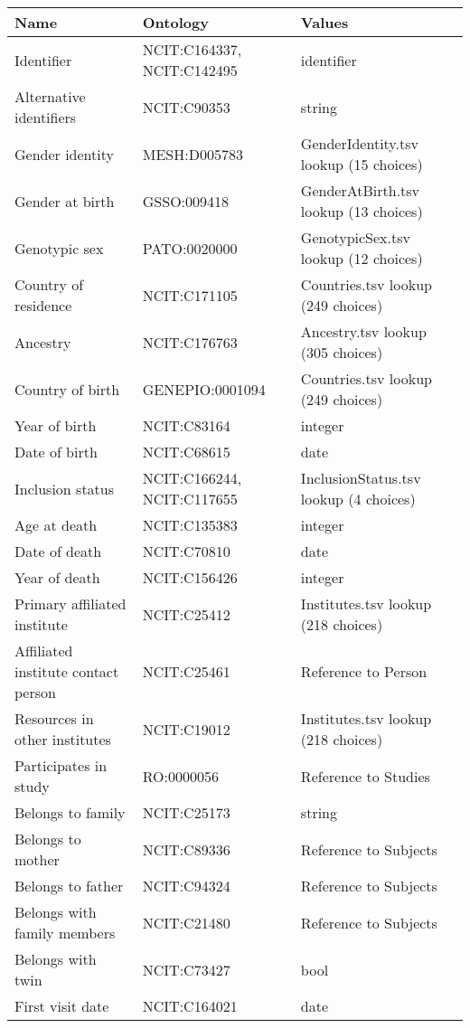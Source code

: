 \documentclass{article}
\begin{document}
\begin{table}[htb]
\begin{tabular}{lll}
Name & Ontology & Values \\
\hline
Identifier & NCIT:C164337, NCIT:C142495  & identifier \\
Alternative identifiers & NCIT:C90353  & string \\
Gender identity & MESH:D005783  & GenderIdentity.tsv lookup (15 choices) \\
Gender at birth & GSSO:009418  & GenderAtBirth.tsv lookup (13 choices) \\
Genotypic sex & PATO:0020000  & GenotypicSex.tsv lookup (12 choices) \\
Country of residence & NCIT:C171105  & Countries.tsv lookup (249 choices) \\
Ancestry & NCIT:C176763  & Ancestry.tsv lookup (305 choices) \\
Country of birth & GENEPIO:0001094  & Countries.tsv lookup (249 choices) \\
Year of birth & NCIT:C83164  & integer \\
Date of birth & NCIT:C68615  & date \\
Inclusion status & NCIT:C166244, NCIT:C117655  & InclusionStatus.tsv lookup (4 choices) \\
Age at death & NCIT:C135383  & integer \\
Date of death & NCIT:C70810  & date \\
Year of death & NCIT:C156426  & integer \\
Primary affiliated institute & NCIT:C25412  & Institutes.tsv lookup (218 choices) \\
Affiliated institute contact person & NCIT:C25461  & Reference to Person \\
Resources in other institutes & NCIT:C19012  & Institutes.tsv lookup (218 choices) \\
Participates in study & RO:0000056  & Reference to Studies \\
Belongs to family & NCIT:C25173  & string \\
Belongs to mother & NCIT:C89336  & Reference to Subjects \\
Belongs to father & NCIT:C94324  & Reference to Subjects \\
Belongs with family members & NCIT:C21480  & Reference to Subjects \\
Belongs with twin & NCIT:C73427  & bool \\
First visit date & NCIT:C164021  & date \\

\end{tabular}
\end{table}
\end{document}
